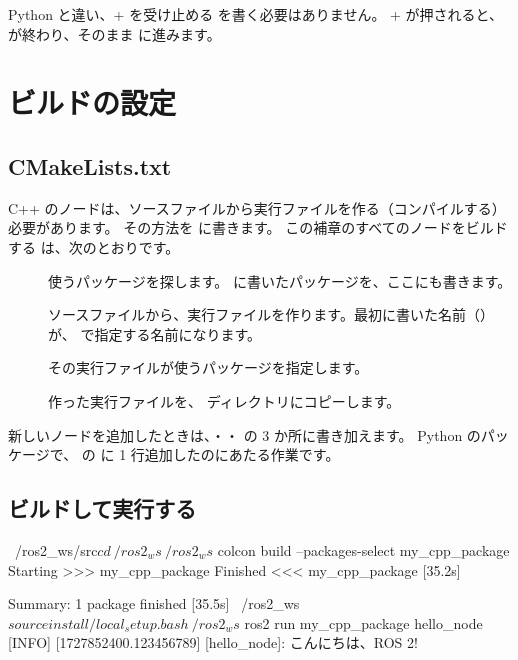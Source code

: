 Python と違い、+ を受け止める  を書く必要はありません。
+ が押されると、 が終わり、そのまま  に進みます。

\section{ビルドの設定}
\label{sec:rclcpp-build}

\subsection{CMakeLists.txt}

C++ のノードは、ソースファイルから実行ファイルを作る（コンパイルする）必要があります。
その方法を  に書きます。
この補章のすべてのノードをビルドする  は、次のとおりです。


\begin{description}
  \item[] 使うパッケージを探します。 に書いたパッケージを、ここにも書きます。
  \item[] ソースファイルから、実行ファイルを作ります。最初に書いた名前（）が、 で指定する名前になります。
  \item[] その実行ファイルが使うパッケージを指定します。
  \item[] 作った実行ファイルを、 ディレクトリにコピーします。
\end{description}

新しいノードを追加したときは、・・ の 3 か所に書き加えます。
Python のパッケージで、 の  に 1 行追加したのにあたる作業です。

\subsection{ビルドして実行する}

\begin{terminal}[C++ のノードをビルドして実行する]
~/ros2_ws/src$ cd ~/ros2_ws
~/ros2_ws$ colcon build --packages-select my_cpp_package
Starting >>> my_cpp_package
Finished <<< my_cpp_package [35.2s]

Summary: 1 package finished [35.5s]
~/ros2_ws$ source install/local_setup.bash
~/ros2_ws$ ros2 run my_cpp_package hello_node
[INFO] [1727852400.123456789] [hello_node]: こんにちは、ROS 2!
\end{terminal}


